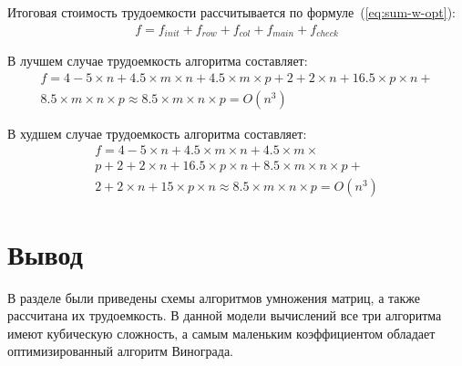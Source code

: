 Итоговая стоимость трудоемкости рассчитывается по формуле~(\ref{eq:sum-w-opt}):
\begin{equation}
    \label{eq:sum-w-opt}
    \begin{gathered}
        f = f_{init} + f_{row} + f_{col} + f_{main} + f_{check}  
    \end{gathered} 
\end{equation}

В лучшем случае трудоемкость алгоритма составляет:
\begin{equation}
    \label{eq:best-w}
    \begin{gathered}
        f = 4 - 5 \times n + 4.5 \times m \times n + 4.5 \times m \times p + 2 + 2 \times n + 16.5 \times p \times n + \\
        8.5 \times m \times n \times p \approx 8.5 \times m \times n \times p = O(n^3)
    \end{gathered} 
\end{equation}

В худшем случае трудоемкость алгоритма составляет:
\begin{equation}
    \label{eq:worst-w}
    \begin{gathered}
        f = 4 - 5 \times n + 4.5 \times m \times n + 4.5 \times m \times \\ p + 2 + 2 \times n + 16.5 \times p \times n + 8.5 \times m \times n \times p + \\
        2 + 2 \times n + 15 \times p \times n \approx 8.5 \times m \times n \times p = O(n^3)
    \end{gathered} 
\end{equation}

\section*{Вывод}

В разделе были приведены схемы алгоритмов умножения матриц, а также рассчитана их трудоемкость. В данной модели вычислений все три алгоритма имеют кубическую сложность, а самым маленьким коэффициентом обладает оптимизированный алгоритм Винограда.
